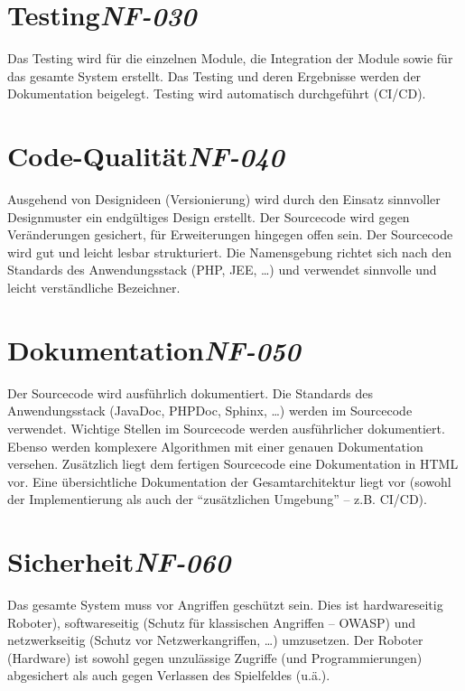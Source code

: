 \section[Testing]{Testing\hfill \emph{NF-030}}

Das Testing wird für die einzelnen Module, die Integration der Module sowie für das gesamte System erstellt. Das Testing und deren Ergebnisse werden der Dokumentation beigelegt. Testing wird automatisch durchgeführt (CI/CD).

\section[Code-Qualität]{Code-Qualität\hfill \emph{NF-040}}

Ausgehend von Designideen (Versionierung) wird durch den Einsatz sinnvoller Designmuster ein endgültiges Design erstellt.
Der Sourcecode wird gegen Veränderungen gesichert, für Erweiterungen hingegen offen sein.
Der Sourcecode wird gut und leicht lesbar strukturiert.
Die Namensgebung richtet sich nach den Standards des Anwendungsstack (PHP, JEE, \dots) und verwendet sinnvolle und leicht verständliche Bezeichner.

\section[Dokumentation]{Dokumentation\hfill \emph{NF-050}}

Der Sourcecode wird ausführlich dokumentiert.
Die Standards des Anwendungsstack (JavaDoc, PHPDoc, Sphinx, \dots) werden im Sourcecode verwendet.
Wichtige Stellen im Sourcecode werden ausführlicher dokumentiert.
Ebenso werden komplexere Algorithmen mit einer genauen Dokumentation versehen.
Zusätzlich liegt dem fertigen Sourcecode eine Dokumentation in HTML vor.
Eine übersichtliche Dokumentation der Gesamtarchitektur liegt vor (sowohl der Implementierung als auch der \enquote{zusätzlichen Umgebung} – z.B. CI/CD).

\section[Sicherheit]{Sicherheit\hfill \emph{NF-060}}

Das gesamte System muss vor Angriffen geschützt sein. Dies ist hardwareseitig Roboter), softwareseitig (Schutz für klassischen Angriffen – OWASP) und netzwerkseitig (Schutz vor Netzwerkangriffen, \dots) umzusetzen.
Der Roboter (Hardware) ist sowohl gegen unzulässige Zugriffe (und Programmierungen) abgesichert als auch gegen Verlassen des Spielfeldes (u.ä.).


